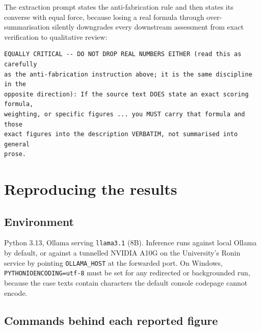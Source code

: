 The extraction prompt states the anti-fabrication rule and then states its
converse with equal force, because losing a real formula through
over-summarisation silently downgrades every downstream assessment from exact
verification to qualitative review:

\begin{lstlisting}
EQUALLY CRITICAL -- DO NOT DROP REAL NUMBERS EITHER (read this as carefully
as the anti-fabrication instruction above; it is the same discipline in the
opposite direction): If the source text DOES state an exact scoring formula,
weighting, or specific figures ... you MUST carry that formula and those
exact figures into the description VERBATIM, not summarised into general
prose.
\end{lstlisting}

\chapter{Reproducing the results}
\label{app:repro}

\section{Environment}

Python 3.13, Ollama serving \texttt{llama3.1} (8B). Inference runs against local
Ollama by default, or against a tunnelled NVIDIA A10G on the University's Ronin
service by pointing \texttt{OLLAMA\_HOST} at the forwarded port. On Windows,
\texttt{PYTHONIOENCODING=utf-8} must be set for any redirected or backgrounded
run, because the case texts contain characters the default console codepage
cannot encode.

\section{Commands behind each reported figure}

